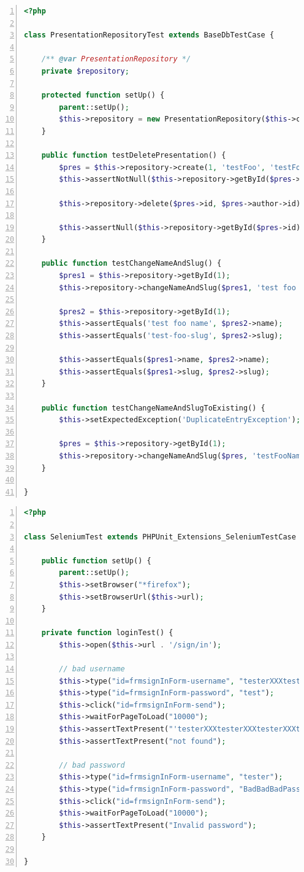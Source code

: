 \documentclass[11pt,twoside,a4paper]{book}
\begin{document}
\begin{lstlisting}[caption={Ukázka integračních testů},label={lst:integrationtest},
language=php,
numbers=left,
breaklines=true]
<?php

class PresentationRepositoryTest extends BaseDbTestCase {

	/** @var PresentationRepository */
	private $repository;

	protected function setUp() {
		parent::setUp();
		$this->repository = new PresentationRepository($this->container->database);
	}

	public function testDeletePresentation() {
		$pres = $this->repository->create(1, 'testFoo', 'testFoo');
		$this->assertNotNull($this->repository->getById($pres->id));

		$this->repository->delete($pres->id, $pres->author->id);

		$this->assertNull($this->repository->getById($pres->id));
	}

	public function testChangeNameAndSlug() {
		$pres1 = $this->repository->getById(1);
		$this->repository->changeNameAndSlug($pres1, 'test foo name', 'test foo slug');

		$pres2 = $this->repository->getById(1);
		$this->assertEquals('test foo name', $pres2->name);
		$this->assertEquals('test-foo-slug', $pres2->slug);

		$this->assertEquals($pres1->name, $pres2->name);
		$this->assertEquals($pres1->slug, $pres2->slug);
	}

	public function testChangeNameAndSlugToExisting() {
		$this->setExpectedException('DuplicateEntryException');

		$pres = $this->repository->getById(1);
		$this->repository->changeNameAndSlug($pres, 'testFooName', 'test2');
	}

}
\end{lstlisting}

\newpage

\begin{lstlisting}[caption={Ukázka Selenium testu},label={lst:seleniumtest},
language=php,
numbers=left,
breaklines=true]
<?php

class SeleniumTest extends PHPUnit_Extensions_SeleniumTestCase {

	public function setUp() {
		parent::setUp();
		$this->setBrowser("*firefox");
		$this->setBrowserUrl($this->url);
	}

	private function loginTest() {
		$this->open($this->url . '/sign/in');

		// bad username
		$this->type("id=frmsignInForm-username", "testerXXXtesterXXXtesterXXXtester");
		$this->type("id=frmsignInForm-password", "test");
		$this->click("id=frmsignInForm-send");
		$this->waitForPageToLoad("10000");
		$this->assertTextPresent("'testerXXXtesterXXXtesterXXXtester'");
		$this->assertTextPresent("not found");

		// bad password
		$this->type("id=frmsignInForm-username", "tester");
		$this->type("id=frmsignInForm-password", "BadBadBadPassword");
		$this->click("id=frmsignInForm-send");
		$this->waitForPageToLoad("10000");
		$this->assertTextPresent("Invalid password");
	}
	
}
\end{lstlisting}
\end{document}
